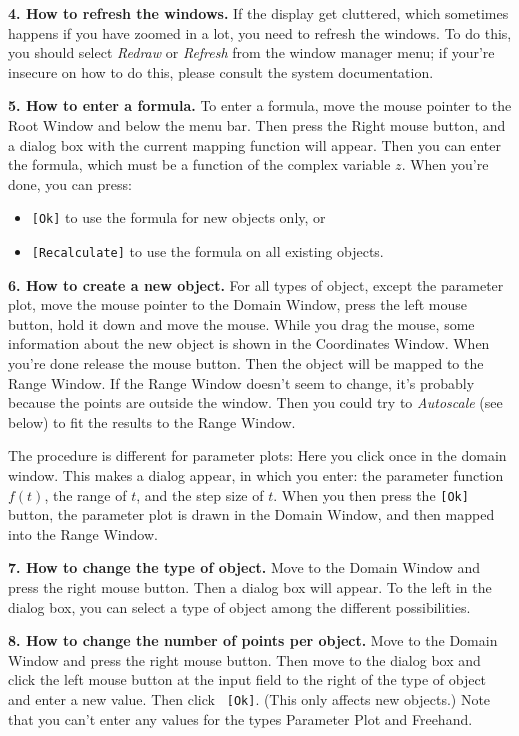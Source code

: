 \documentclass[10pt,a4paper]{article}
\begin{document}
{\bf 4. How to refresh the windows.} If the display get cluttered,
which sometimes happens if you have zoomed in a lot, you need to
refresh the windows. To do this, you should select {\it Redraw} or
{\it Refresh} from the window manager menu; if your're insecure on how
to do this, please consult the system documentation.



{\bf 5. How to enter a formula.} To enter a formula, move the mouse
pointer to the Root Window and below the menu bar. Then press the
Right mouse button, and a dialog box with the current mapping function
will appear. Then you can enter the formula, which must be a function
of the complex variable $z$. When you're done, you can press:
\begin{itemize}
\item {\tt [Ok]} to use the formula for new objects only, or
\item {\tt [Recalculate]} to use the formula on all existing objects.
\end{itemize}



{\bf 6. How to create a new object.} For all types of object, except
the parameter plot, move the mouse pointer to the Domain Window, press
the left mouse button, hold it down and move the mouse. While you drag
the mouse, some information about the new object is shown in the
Coordinates Window. When you're done release the mouse button. Then
the object will be mapped to the Range Window. If the Range Window
doesn't seem to change, it's probably because the points are outside
the window. Then you could try to {\it Autoscale} (see below) to fit
the results to the Range Window.

The procedure is different for parameter plots: Here you click once in
the domain window. This makes a dialog appear, in which you enter: the
parameter function $f(t)$, the range of $t$, and the step size of
$t$. When you then press the {\tt [Ok]} button, the parameter plot is
drawn in the Domain Window, and then mapped into the Range Window.



{\bf 7. How to change the type of object.} Move to the Domain Window
and press the right mouse button. Then a dialog box will appear. To
the left in the dialog box, you can select a type of object among the
different possibilities.



{\bf 8. How to change the number of points per object.} Move to the
Domain Window and press the right mouse button. Then move to the
dialog box and click the left mouse button at the input field to the
right of the type of object and enter a new value. Then click {\tt
[Ok]}.  (This only affects new objects.) Note that you can't enter any
values for the types Parameter Plot and Freehand.
\end{document}

